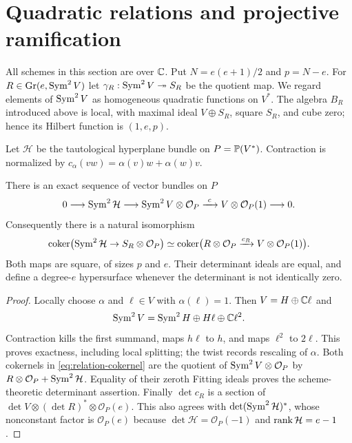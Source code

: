 \section{Quadratic relations and projective ramification}
\label{sec:relations-ramification}
All schemes in this section are over $\mathbb C$. Put
$N=e(e+1)/2$ and $p=N-e$. For $R\in\operatorname{Gr}(e,\operatorname{Sym}^2V)$ let
$\gamma_R:\operatorname{Sym}^2V\twoheadrightarrow S_R$ be the quotient map.
We regard elements of $\operatorname{Sym}^2V$ as homogeneous quadratic functions
on $V^*$. The algebra $B_R$ introduced above is local, with maximal
ideal $V\oplus S_R$, square $S_R$, and cube zero; hence its Hilbert
function is $(1,e,p)$.

Let $\mathcal H$ be the tautological hyperplane bundle on
$P=\mathbb P(V^*)$. Contraction is normalized by
$c_\alpha(vw)=\alpha(v)w+\alpha(w)v$.

\begin{lemma}
\label{lem:restriction-contraction}
There is an exact sequence of vector bundles on $P$
\begin{equation}\label{eq:contraction-sequence}
 0\longrightarrow\operatorname{Sym}^2\mathcal H
 \longrightarrow\operatorname{Sym}^2V\otimes\mathcal O_P
 \xrightarrow{\ c\ }V\otimes\mathcal O_P(1)
 \longrightarrow0.
\end{equation}
Consequently there is a natural isomorphism
\begin{equation}\label{eq:relation-cokernel}
 \operatorname{coker}\bigl(\operatorname{Sym}^2\mathcal H\to
                      S_R\otimes\mathcal O_P\bigr)
 \simeq
 \operatorname{coker}\bigl(R\otimes\mathcal O_P
                    \xrightarrow{c_R}V\otimes\mathcal O_P(1)\bigr).
\end{equation}
Both maps are square, of sizes $p$ and $e$. Their determinant ideals
are equal, and define a degree-$e$ hypersurface whenever the determinant
is not identically zero.
\end{lemma}
\begin{proof}
Locally choose $\alpha$ and $\ell\in V$ with $\alpha(\ell)=1$.
Then $V=H\oplus\mathbb C\ell$ and
\[
 \operatorname{Sym}^2V=\operatorname{Sym}^2H\oplus H\ell\oplus\mathbb C\ell^2.
\]
Contraction kills the first summand, maps $h\ell$ to $h$, and maps
$\ell^2$ to $2\ell$. This proves exactness, including local splitting;
the twist records rescaling of $\alpha$. Both cokernels in
\eqref{eq:relation-cokernel} are the quotient of
$\operatorname{Sym}^2V\otimes\mathcal O_P$ by
$R\otimes\mathcal O_P+\operatorname{Sym}^2\mathcal H$. Equality of their zeroth
Fitting ideals proves the scheme-theoretic determinant assertion.
Finally $\det c_R$ is a section of
$\det V\otimes(\det R)^*\otimes\mathcal O_P(e)$.
This also agrees with
$\det(\operatorname{Sym}^2\mathcal H)^*$, whose nonconstant factor is
$\mathcal O_P(e)$ because $\det\mathcal H=\mathcal O_P(-1)$ and
$\operatorname{rank}\mathcal H=e-1$.
\end{proof}

